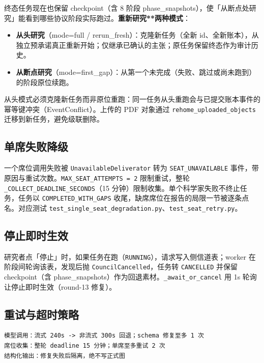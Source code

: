 终态任务现在也保留 checkpoint（含 8 阶段 phase\_snapshots），使「从断点处研究」能看到哪些协议阶段实际跑过。\textbf{重新研究**两种模式}：

\begin{itemize}
\item \textbf{从头研究}（mode=full / rerun\_fresh）：克隆新任务（全新 id、全新账本），从独立预承诺真正重新开始；仅继承已确认的主张；原任务保留终态作为审计历史。
\item \textbf{从断点研究}（mode=first\_gap）：从第一个未完成（失败、跳过或尚未跑到）的阶段原位续跑。
\end{itemize}

从头模式必须克隆新任务而非原位重跑：同一任务从头重跑会与已提交账本事件的幂等键冲突（EventConflict）。上传的 PDF 对象通过 \texttt{rehome\_uploaded\_objects} 迁移到新任务，避免级联删除。

\subsection{单席失败降级}

一个席位调用失败被 \texttt{UnavailableDeliverator} 转为 \texttt{SEAT\_UNAVAILABLE} 事件，带原因与重试次数。\texttt{MAX\_SEAT\_ATTEMPTS = 2} 限制重试，整轮 \texttt{\_COLLECT\_DEADLINE\_SECONDS}（15 分钟）限制收集。单个科学家失败不终止任务，任务以 \texttt{COMPLETED\_WITH\_GAPS} 收尾，缺席席位在报告的局限一节被逐条点名。对应测试 \texttt{test\_single\_seat\_degradation.py}、\texttt{test\_seat\_retry.py}。

\subsection{停止即时生效}

研究者点「停止」时，如果任务在跑（\texttt{RUNNING}），请求写入侧信道表；worker 在阶段间轮询该表，发现后抛 \texttt{CouncilCancelled}，任务转 \texttt{CANCELLED} 并保留 checkpoint（含 phase\_snapshots）作为回退素材。\texttt{\_await\_or\_cancel} 用 1s 轮询让停止即时生效（round-13 修复）。

\subsection{重试与超时策略}

\begin{lstlisting}
模型调用：流式 240s -> 非流式 300s 回退；schema 修复至多 1 次
席位收集：整轮 deadline 15 分钟；单席至多重试 2 次
结构化输出：修复失败后隔离，绝不写正式图
\end{lstlisting}

